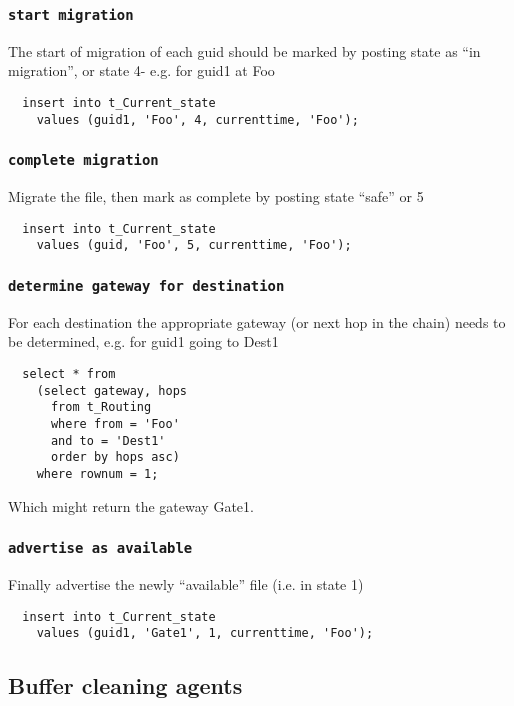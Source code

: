 \documentclass{cmspaper}
\begin{document}
\subsubsection{\textbf{\texttt{start migration}}}
The start of migration of each guid should be marked by posting state as ``in migration'', or state 4- e.g. for guid1 at Foo

{\small\begin{verbatim}
  insert into t_Current_state
    values (guid1, 'Foo', 4, currenttime, 'Foo');
\end{verbatim}}

\subsubsection{\textbf{\texttt{complete migration}}}
Migrate the file, then mark as complete by posting state ``safe'' or 5

{\small\begin{verbatim}
  insert into t_Current_state
    values (guid, 'Foo', 5, currenttime, 'Foo');
\end{verbatim}}

\subsubsection{\textbf{\texttt{determine gateway for destination}}}
For each destination the appropriate gateway (or next hop in the chain) needs to be determined, e.g. for guid1 going to Dest1

{\small\begin{verbatim}
  select * from
    (select gateway, hops
      from t_Routing
      where from = 'Foo'
      and to = 'Dest1'
      order by hops asc)
    where rownum = 1;
\end{verbatim}}

Which might return the gateway Gate1. 

\subsubsection{\textbf{\texttt{advertise as available}}}
Finally advertise the newly ``available'' file (i.e. in state 1)

{\small\begin{verbatim}
  insert into t_Current_state
    values (guid1, 'Gate1', 1, currenttime, 'Foo');
\end{verbatim}}


\subsection{Buffer cleaning agents}
\end{document}
